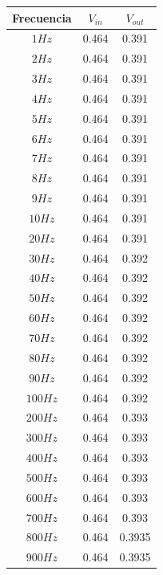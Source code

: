 \documentclass[letterpaper,10pt]{article}
\begin{document}
    \begin{center}
    	\begin{tabular}{|c|c|c|}
    		\hline 
    		Frecuencia & $V_{in}$ & $V_{out}$  \\ 
    		\hline 
    		$1 Hz$  & 0.464 & 0.391 \\
    		\hline 
    		$2 Hz$  & 0.464 & 0.391 \\
    		\hline 
    		$3 Hz$  & 0.464 & 0.391 \\
    		\hline 
    		$4 Hz$  & 0.464 & 0.391 \\
    		\hline 
    		$5 Hz$  & 0.464 & 0.391 \\
    		\hline 
    		$6 Hz$  & 0.464 & 0.391 \\
    		\hline 
    		$7 Hz$  & 0.464 & 0.391 \\
    		\hline 
    		$8 Hz$  & 0.464 & 0.391 \\
    		\hline 
    		$9 Hz$  & 0.464 & 0.391 \\
    		\hline 
    		$10 Hz$  & 0.464 & 0.391 \\
    		\hline 
    		$20 Hz$  & 0.464 & 0.391 \\
    		\hline 
    		$30 Hz$  & 0.464 & 0.392 \\
    		\hline 
    		$40 Hz$  & 0.464 & 0.392 \\
    		\hline 
    		$50 Hz$  & 0.464 & 0.392 \\
    		\hline 
    		$60 Hz$  & 0.464 & 0.392 \\
    		\hline 
    		$70 Hz$  & 0.464 & 0.392 \\
    		\hline 
    		$80 Hz$  & 0.464 & 0.392 \\
    		\hline 
    		$90 Hz$  & 0.464 & 0.392 \\
    		\hline 
    		$100 Hz$  & 0.464 & 0.392 \\ 
    		\hline 
    		$200 Hz$  & 0.464 & 0.393 \\
    		\hline 
    		$300 Hz$  & 0.464 & 0.393 \\
    		\hline
    		$400 Hz$  & 0.464 & 0.393 \\
    		\hline 
    		$500 Hz$  & 0.464 & 0.393 \\
    		\hline 
    		$600 Hz$  & 0.464 & 0.393 \\
    		\hline 
    		$700 Hz$  & 0.464 & 0.393 \\
    		\hline 
    		$800 Hz$  & 0.464 & 0.3935 \\
    		\hline 
    		$900 Hz$  & 0.464 & 0.3935 \\

\end{tabular}
\end{center}
\end{document}

